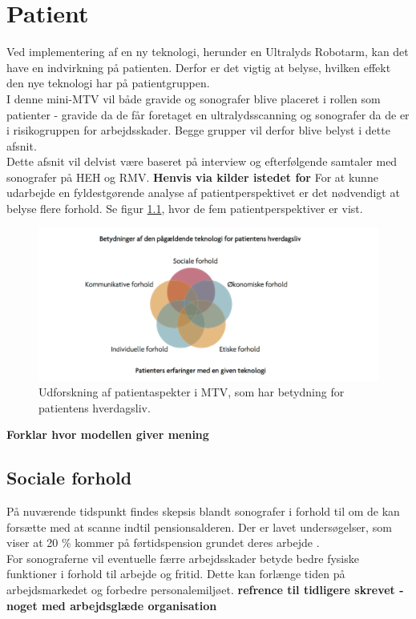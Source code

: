 \chapter{Patient}
Ved implementering af en ny teknologi, herunder en Ultralyds Robotarm, kan det have en indvirkning på patienten. Derfor er det vigtig at belyse, hvilken effekt den nye teknologi har på patientgruppen. \\
I denne mini-MTV vil både gravide og sonografer blive placeret i rollen som patienter - gravide da de får foretaget en ultralydsscanning og sonografer da de er i risikogruppen for arbejdsskader. Begge grupper vil derfor blive belyst i dette afsnit.  \\ \newline
Dette afsnit vil delvist være baseret på interview og efterfølgende samtaler med sonografer på HEH og RMV. \textbf{Henvis via kilder istedet for} 
\newline
For at kunne udarbejde en fyldestgørende analyse af patientperspektivet er det nødvendigt at belyse flere forhold. Se figur \ref{patientMTV}, hvor de fem patientperspektiver er vist. 
\begin{figure}[h!]\centering
	\includegraphics[width = 1.0\textwidth]{Figurer/PatientaspekterMTV}
	\caption{Udforskning af patientaspekter i MTV, som har betydning for patientens hverdagsliv. \cite{Leavitt}}
	\label{patientMTV}
\end{figure}

\textbf{Forklar hvor modellen giver mening}

\section{Sociale forhold}
På nuværende tidspunkt findes skepsis blandt sonografer i forhold til om de kan forsætte med at scanne indtil pensionsalderen. Der er lavet undersøgelser, som viser at 20 \% kommer på førtidspension grundet deres arbejde \cite{BeckyMorton2007}.  \\ 
For sonograferne vil eventuelle færre arbejdsskader betyde bedre fysiske funktioner i forhold til arbejde og fritid. Dette kan forlænge tiden på arbejdsmarkedet og forbedre personalemiljøet. \textbf{refrence til tidligere skrevet - noget med arbejdsglæde organisation}      

